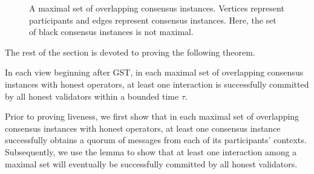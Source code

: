\begin{figure}
\caption{A maximal set of overlapping consensus instances. Vertices represent participants and edges represent consensus instances. Here, the set of black consensus instances is not maximal.}
\label{fig:overlaps}
\end{figure}


The rest of the section is devoted to proving the following theorem.

\begin{theorem}[Liveness] 
    In each view beginning after GST, in each maximal set of overlapping consensus instances with honest operators, at least one interaction is successfully committed by all honest validators within a bounded time $\tau$.
\end{theorem}



Prior to proving liveness, we first show that in each maximal set of overlapping consensus instances with honest operators, at least one consensus instance successfully obtains a quorum of  messages from each of its participants' contexts. Subsequently, we use the lemma to show that at least one interaction among a maximal set will eventually be successfully committed by all honest validators. 

